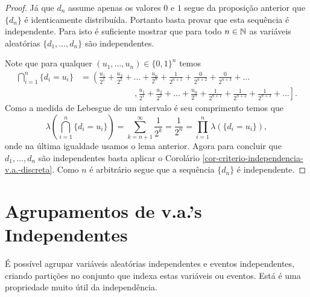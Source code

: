 \begin{proof}
Já que $d_n$ assume apenas os valores $0$ e $1$ segue da
proposição anterior que $\{d_n\}$ é identicamente distribuída.
Portanto basta provar que esta sequência é independente. 
Para isto é suficiente mostrar que para todo $n\in\mathbb{N}$ 
as variáveis aleatórias $\{d_1,\ldots,d_n\}$ são independentes.

Note que para qualquer $(u_1,\ldots,u_n)\in \{0,1\}^n$
temos 
	\begin{align*}
		\bigcap_{i=1}^{n} \{d_i=u_i\}
		&=
		\left(
		\frac{u_1}{2^1}+\frac{u_2}{2^2}+\ldots+\frac{u_{n}}{2^{n}}+\frac{1}{2^{n+1}}
		+\frac{0}{2^{n+2}}+\frac{0}{2^{n+3}}+
		\ldots
		\right.
		\\
		&\qquad\qquad\qquad
		\ \ \mathbf{,} 
		\left.
		\frac{u_1}{2^1}+\frac{u_2}{2^2}+\ldots+\frac{u_{n}}{2^{n}}+\frac{1}{2^{n+1}}
		+\frac{1}{2^{n+2}}+\frac{1}{2^{n+3}}+
		\ldots
		\right].
	\end{align*}
Como a medida de Lebesgue de um intervalo é seu comprimento temos que  
	\[
		\lambda
		\left( 
				\bigcap_{i=1}^{n} \{d_i=u_i\}
		\right)
		=
		\sum_{k=n+1}^{\infty} \frac{1}{2^k}
		=
		\frac{1}{2^n}
		=
		\prod_{i=1}^n \lambda(\{d_i=u_i\}),
	\]
onde na última igualdade usamos o lema anterior.
Agora para concluir que $d_1,\ldots,d_n$ são independentes
basta aplicar o Corolário 
\ref{cor-criterio-independencia-v.a.-discreta}.
Como $n$ é arbitrário segue que a sequência 
$\{d_n\}$ é independente.
\end{proof}


















\section{Agrupamentos de v.a.'s Independentes}


É possível agrupar variáveis aleatórias independentes
e eventos independentes, criando partições no conjunto
que indexa estas variáveis ou eventos. Está é uma
propriedade muito útil da independência.

